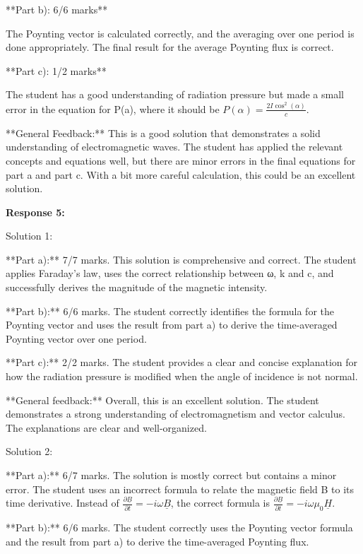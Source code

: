 \documentclass[a4paper,11pt]{article}
\begin{document}
**Part b): 6/6 marks**

The Poynting vector is calculated correctly, and the averaging over one period is done appropriately. The final result for the average Poynting flux is correct.

**Part c): 1/2 marks**

The student has a good understanding of radiation pressure but made a small error in the equation for P(a), where it should be \(P(\alpha) = \frac{2I\cos^{2}(\alpha)}{c}\).

**General Feedback:** This is a good solution that demonstrates a solid understanding of electromagnetic waves. The student has applied the relevant concepts and equations well, but there are minor errors in the final equations for part a and part c. With a bit more careful calculation, this could be an excellent solution.

\bigskip    
\textbf{Response 5:}

Solution 1:

**Part a):** 7/7 marks. This solution is comprehensive and correct. The student applies Faraday’s law, uses the correct relationship between ω, k and c, and successfully derives the magnitude of the magnetic intensity. 

**Part b):** 6/6 marks. The student correctly identifies the formula for the Poynting vector and uses the result from part a) to derive the time-averaged Poynting vector over one period. 

**Part c):** 2/2 marks. The student provides a clear and concise explanation for how the radiation pressure is modified when the angle of incidence is not normal.

**General feedback:** Overall, this is an excellent solution. The student demonstrates a strong understanding of electromagnetism and vector calculus. The explanations are clear and well-organized.

Solution 2:

**Part a):** 6/7 marks. The solution is mostly correct but contains a minor error. The student uses an incorrect formula to relate the magnetic field B to its time derivative. Instead of \(\frac{\partial \underline{B}}{\partial t} = -i\omega \underline{B}\), the correct formula is \(\frac{\partial \underline{B}}{\partial t} = -i\omega\mu_0 \underline{H}\). 

**Part b):** 6/6 marks. The student correctly uses the Poynting vector formula and the result from part a) to derive the time-averaged Poynting flux.
\end{document}
